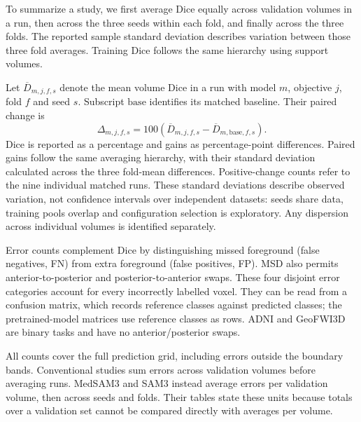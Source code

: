 To summarize a study, we first average Dice equally across validation
volumes in a run, then across the three seeds within each fold, and
finally across the three folds. The reported sample standard deviation
describes variation between those three fold averages. Training Dice
follows the same hierarchy using support volumes.

Let $\overline D_{m,j,f,s}$ denote the mean volume Dice in a run with
model $m$, objective $j$, fold $f$ and seed $s$. Subscript
$\mathrm{base}$ identifies its matched baseline. Their paired change is
\begin{equation}
 \Delta_{m,j,f,s}=100\left(
 \overline D_{m,j,f,s}-\overline D_{m,\mathrm{base},f,s}\right).
\label{eq:paired-reported-gain}
\end{equation}
Dice is reported as a percentage and gains as percentage-point
differences. Paired gains follow the same averaging hierarchy, with
their standard deviation calculated across the three fold-mean
differences. Positive-change counts refer to the nine individual
matched runs. These standard deviations describe observed variation,
not confidence intervals over independent datasets: seeds share data,
training pools overlap and configuration selection is exploratory.
Any dispersion across individual volumes is identified separately.

Error counts complement Dice by distinguishing missed foreground
(false negatives, FN) from extra foreground (false positives, FP).
MSD also permits anterior-to-posterior and posterior-to-anterior swaps.
These four disjoint error categories account for every incorrectly
labelled voxel. They can be read from a confusion matrix, which records
reference classes against predicted classes; the pretrained-model
matrices use reference classes as rows. ADNI and GeoFWI3D are binary
tasks and have no anterior/posterior swaps.

All counts cover the full prediction grid, including errors outside
the boundary bands. Conventional studies sum errors across validation
volumes before averaging runs. MedSAM3 and SAM3 instead average errors
per validation volume, then across seeds and folds. Their tables state
these units because totals over a validation set cannot be compared
directly with averages per volume.

\clearpage

